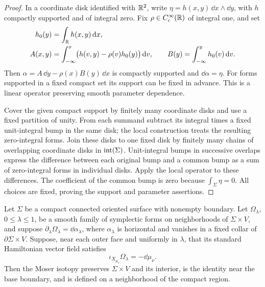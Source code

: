 \begin{proof}
In a coordinate disk identified with $\mathbb R^2$, write
$\eta=h(x,y)\,\dd x\wedge\dd y$, with $h$ compactly supported and of
integral zero.  Fix $\rho\in C_c^\infty(\mathbb R)$ of integral one, and set
\[
 \begin{split}
 h_0(y)&=\int_\mathbb R h(x,y)\,\mathrm d x,\\
 A(x,y)&=\int_{-\infty}^x
             \bigl(h(v,y)-\rho(v)h_0(y)\bigr)\,\mathrm d v,\qquad
 B(y)=\int_{-\infty}^y h_0(v)\,\mathrm d v.
 \end{split}
\]
Then $\alpha=A\,\dd y-\rho(x)B(y)\,\dd x$ is compactly supported and
$\dd\alpha=\eta$.  For forms supported in a fixed compact set its
support can be fixed in advance.  This is a linear operator preserving
smooth parameter dependence.

Cover the given compact support by finitely many coordinate disks and
use a fixed partition of unity.  From each summand subtract its integral
times a fixed unit-integral bump in the same disk; the local construction
treats the resulting zero-integral forms.  Join these disks to one
fixed disk by finitely many chains of overlapping coordinate disks in
$\operatorname{int}(\Sigma)$.  Unit-integral bumps in successive overlaps express
the difference between each original bump and a common bump as a sum
of zero-integral forms in individual disks.  Apply the local operator
to these differences.  The coefficient of the common bump is zero
because $\int_\Sigma\eta=0$.  All choices are fixed, proving the
support and parameter assertions.
\end{proof}

\begin{lemma}\label{surf:moser}
Let $\Sigma$ be a compact connected oriented surface with nonempty
boundary. Let $\Omega_\lambda$, $0\leq\lambda\leq1$, be a smooth family of symplectic forms on
neighborhoods of $\Sigma\times V$, and suppose
$\partial_\lambda\Omega_\lambda=\dd\alpha_\lambda$, where
$\alpha_\lambda$ is horizontal and vanishes in a fixed collar of
$\partial\Sigma\times V$.  Suppose, near each outer face and uniformly
in $\lambda$, that its standard Hamiltonian vector field satisfies
\[
       \iota_{X_{\mu_\nu}}\Omega_\lambda=-\dd\mu_\nu.
\]
Then the Moser isotopy preserves $\Sigma\times V$ and its interior,
is the identity near the base boundary, and is defined on a
neighborhood of the compact region.
\end{lemma}

